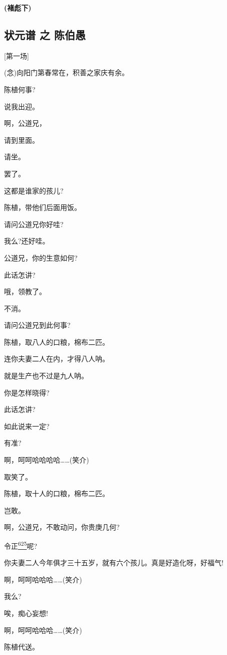 \textbf{(褚彪下)}

\hypertarget{ux72b6ux5143ux8c31-ux4e4b-ux9648ux4f2fux611a}{%
\subsection{状元谱 之
陈伯愚}\label{ux72b6ux5143ux8c31-ux4e4b-ux9648ux4f2fux611a}}

{[}第一场{]}

(念)向阳门第春常在，积善之家庆有余。

陈植何事?

说我出迎。

啊，公道兄，

请到里面。

请坐。

罢了。

这都是谁家的孩儿?

陈植，带他们后面用饭。

请问公道兄你好哇?

我么?还好哇。

公道兄，你的生意如何?

此话怎讲?

哦，领教了。

不消。

请问公道兄到此何事?

陈植，取八人的口粮，棉布二匹。

连你夫妻二人在内，才得八人呐。

就是生产也不过是九人呐。

你是怎样晓得?

此话怎讲?

如此说来一定?

有准?

啊，呵呵哈哈哈哈\ldots{}\ldots{}(笑介)

取笑了。

陈植，取十人的口粮，棉布二匹。

岂敢。

啊，公道兄，不敢动问，你贵庚几何?

令正\protect\hyperlink{fn625}{\textsuperscript{625}}呢?

你夫妻二人今年俱才三十五岁，就有六个孩儿。真是好造化呀，好福气!

啊，呵呵哈哈哈\ldots{}\ldots{}(笑介)

我么?

唉，痴心妄想!

啊，呵呵哈哈哈\ldots{}\ldots{}(笑介)

陈植代送。


